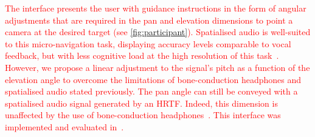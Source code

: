 \documentclass[acmsmall]{acmart}
\newcommand\hl[1]{\textcolor{red}{#1}}
\begin{document}
\hl{The interface presents the user with guidance instructions in the form of angular adjustments that are required in the pan and elevation dimensions to point a camera at the desired target (see \cref{fig:participant}).
Spatialised audio is well-suited to this micro-navigation task, displaying accuracy levels comparable to vocal feedback, but with less cognitive load at the high resolution of this task~\citep{klatzky2006cognitive}. 
However, we propose a linear adjustment to the signal's pitch as a function of the elevation angle to overcome the limitations of bone-conduction headphones and spatialised audio stated previously.
The pan angle can still be conveyed with a spatialised audio signal generated by an HRTF.
Indeed, this dimension is unaffected by the use of bone-conduction headphones~\citep{schonstein2008comparison,macdonald2006spatial,stanley2006lateralization,lock2019bone}. 
This interface was implemented and evaluated in~\citet{lock2019bone}.}


\end{document}
